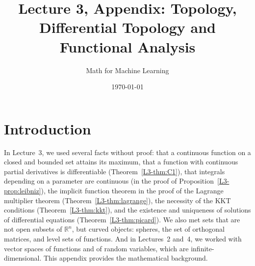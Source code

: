 \documentclass[11pt]{article}
\title{Lecture 3, Appendix: Topology, Differential Topology and Functional Analysis}
\author{Math for Machine Learning}
\date{\today}
\theoremstyle{definition}
\theoremstyle{plain}
\theoremstyle{remark}
\begin{document}
\maketitle
\tableofcontents

\section*{Introduction}

In Lecture~3, we used several facts without proof: that a continuous function on a closed and bounded set attains its maximum, that a function with continuous partial derivatives is differentiable (Theorem~\ref{L3-thm:C1}), that integrals depending on a parameter are continuous (in the proof of Proposition~\ref{L3-prop:leibniz}), the implicit function theorem in the proof of the Lagrange multiplier theorem (Theorem~\ref{L3-thm:lagrange}), the necessity of the KKT conditions (Theorem~\ref{L3-thm:kkt}), and the existence and uniqueness of solutions of differential equations (Theorem~\ref{L3-thm:picard}). We also met sets that are not open subsets of $\mathbb{R}^n$, but curved objects: spheres, the set of orthogonal matrices, and level sets of functions. And in Lectures~2 and~4, we worked with vector spaces of functions and of random variables, which are infinite-dimensional. This appendix provides the mathematical background.
\end{document}
